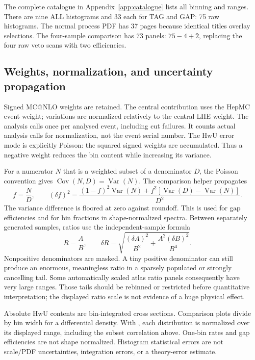 \documentclass[11pt,a4paper]{article}
\newcommand{\code}[1]{\texttt{\detokenize{#1}}}
\begin{document}
The complete catalogue in Appendix~\ref{app:catalogue} lists all binning and
ranges. There are nine ALL histograms and 33 each for TAG and GAP: 75 raw
histograms. The normal process PDF has 37 pages because identical titles
overlay selections. The four-sample comparison has 73 panels:
$75-4+2$, replacing the four raw veto scans with two efficiencies.

\subsection{Weights, normalization, and uncertainty propagation}\label{sec:statistics}

Signed MC@NLO weights are retained. The central contribution uses the
HepMC event weight; variations are normalized relatively to the central
LHE weight. The analysis calls \code{HwU_add_points} once per analysed event,
including cut failures. It counts actual analysis calls for normalization,
not the event serial number. The HwU error mode is explicitly Poisson:
the squared signed weights are accumulated. Thus a negative weight reduces
the bin content while increasing its variance.

For a numerator $N$ that is a weighted subset of a denominator $D$, the
Poisson convention gives $\operatorname{Cov}(N,D)=\operatorname{Var}(N)$.
The comparison helper propagates
\begin{equation}
 f=\frac ND,\qquad
 (\delta f)^2=\frac{(1-f)^2\operatorname{Var}(N)
              +f^2[\operatorname{Var}(D)-\operatorname{Var}(N)]}{D^2}.
\end{equation}
The variance difference is floored at zero against roundoff. This is used
for gap efficiencies and for bin fractions in shape-normalized spectra.
Between separately generated samples, ratios use the independent-sample
formula
\begin{equation}
 R=\frac AB,\qquad
 \delta R=\sqrt{\frac{(\delta A)^2}{B^2}
                   +\frac{A^2(\delta B)^2}{B^4}}.
\end{equation}
Nonpositive denominators are masked. A tiny positive denominator can still
produce an enormous, meaningless ratio in a sparsely populated or strongly
cancelling tail. Some automatically scaled atlas ratio panels consequently
have very large ranges. Those tails should be rebinned or restricted before
quantitative interpretation; the displayed ratio scale is not evidence of
a huge physical effect.

Absolute HwU contents are bin-integrated cross sections. Comparison plots
divide by bin width for a differential density. With \code{--shape}, each
distribution is normalized over its displayed range, including the subset
correlation above. One-bin rates and gap efficiencies are not shape
normalized. Histogram statistical errors are not scale/PDF uncertainties,
integration errors, or a theory-error estimate.
\end{document}
